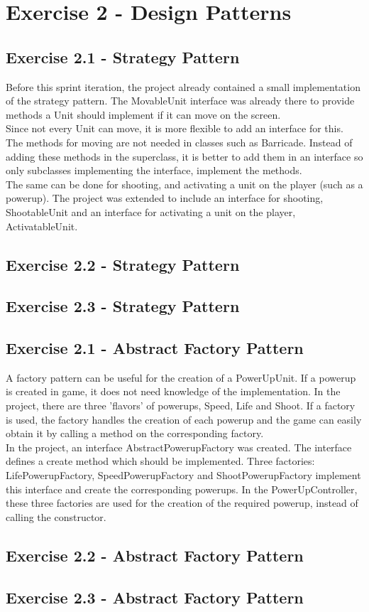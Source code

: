 \documentclass[10pt]{article}
\begin{document}
\section{Exercise 2 - Design Patterns}
\subsection{Exercise 2.1 - Strategy Pattern}
Before this sprint iteration, the project already contained a small implementation of the strategy pattern. The MovableUnit interface was already there to provide methods a Unit should implement if it can move on the screen.\\

Since not every Unit can move, it is more flexible to add an interface for this. 
The methods for moving are not needed in classes such as Barricade. 
Instead of adding these methods in the superclass, it is better to add them in an interface so only subclasses implementing the interface, implement the methods.\\

The same can be done for shooting, and activating a unit on the player (such as a powerup).
The project was extended to include an interface for shooting, ShootableUnit and an interface for activating a unit on the player, ActivatableUnit. 

\subsection{Exercise 2.2 - Strategy Pattern}

\subsection{Exercise 2.3 - Strategy Pattern}

\subsection{Exercise 2.1 - Abstract Factory Pattern}
A factory pattern can be useful for the creation of a PowerUpUnit. If a powerup is created in game, it does not need knowledge of the implementation. In the project, there are three 'flavors' of powerups, Speed, Life and Shoot. If a factory is used, the factory handles the creation of each powerup and the game can easily obtain it by calling a method on the corresponding factory.\\

In the project, an interface AbstractPowerupFactory was created. The interface defines a create method which should be implemented. Three factories: LifePowerupFactory, SpeedPowerupFactory and ShootPowerupFactory implement this interface and create the corresponding powerups. In the PowerUpController, these three factories are used for the creation of the required powerup, instead of calling the constructor. 
\subsection{Exercise 2.2 - Abstract Factory Pattern}

\subsection{Exercise 2.3 - Abstract Factory Pattern}
\end{document}
